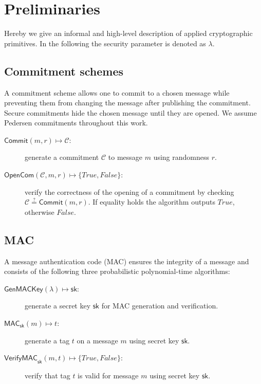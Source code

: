 \documentclass[a4paper]{article}
\begin{document}
\section{Preliminaries}\label{sec:preliminaries}

Hereby we give an informal and high-level description of applied cryptographic primitives. In the following the security parameter is denoted as $\lambda$.

\subsection{Commitment schemes}
A commitment scheme allows one to commit to a chosen message while preventing them from changing the message after publishing the commitment. Secure commitments hide the chosen message until they are opened. We assume Pedersen commitments throughout this work.

\begin{description}

\item[$\mathsf{Commit}(m,r)\mapsto{}\mathcal{C}$:] generate a commitment $\mathcal{C}$ to message $m$ using randomness $r$.

\item[$\mathsf{OpenCom}(\mathcal{C},m,r)\mapsto{}\{\mathit{True},\mathit{False}\}$:] verify the correctness of the opening of a commitment by checking $\mathcal{C}\stackrel{?}{=}\mathsf{Commit}(m,r)$. If equality holds the algorithm outputs $\mathit{True}$, otherwise $\mathit{False}$.

\end{description}

\subsection{MAC}
A message authentication code (MAC) ensures the integrity of a message and consists of the following three probabilistic polynomial-time algorithms:

\begin{description}

\item[$\mathsf{GenMACKey}(\lambda)\mapsto{}{\mathsf{sk}}$:] generate a secret key $\mathsf{sk}$ for MAC generation and verification.

\item[$\mathsf{MAC}_{\mathsf{sk}}(m)\mapsto{}t$:] generate a tag $t$ on a message $m$ using secret key $\mathsf{sk}$.

\item[$\mathsf{VerifyMAC}_{\mathsf{sk}}(m,t)\mapsto{}\{\mathit{True},\mathit{False}\}$:] verify that tag $t$ is valid for message $m$ using secret key $\mathsf{sk}$.

\end{description}
\end{document}
